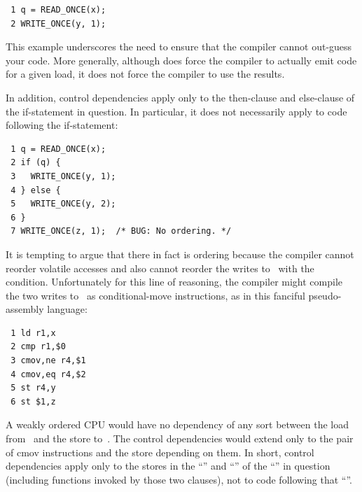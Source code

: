 \vspace{5pt}
\begin{minipage}[t]{\columnwidth}
\scriptsize
\begin{verbatim}
 1 q = READ_ONCE(x);
 2 WRITE_ONCE(y, 1);
\end{verbatim}
\end{minipage}
\vspace{5pt}

This example underscores the need to ensure that the compiler cannot
out-guess your code.
More generally, although  does force
the compiler to actually emit code for a given load, it does not force
the compiler to use the results.

In addition, control dependencies apply only to the then-clause and
else-clause of the if-statement in question.
In particular, it does
not necessarily apply to code following the if-statement:

\vspace{5pt}
\begin{minipage}[t]{\columnwidth}
\scriptsize
\begin{verbatim}
 1 q = READ_ONCE(x);
 2 if (q) {
 3   WRITE_ONCE(y, 1);
 4 } else {
 5   WRITE_ONCE(y, 2);
 6 }
 7 WRITE_ONCE(z, 1);  /* BUG: No ordering. */
\end{verbatim}
\end{minipage}
\vspace{5pt}

It is tempting to argue that there in fact is ordering because the
compiler cannot reorder volatile accesses and also cannot reorder
the writes to~ with the condition.
Unfortunately for this line
of reasoning, the compiler might compile the two writes to~ as
conditional-move instructions, as in this fanciful pseudo-assembly
language:

\vspace{5pt}
\begin{minipage}[t]{\columnwidth}
\scriptsize
\begin{verbatim}
 1 ld r1,x
 2 cmp r1,$0
 3 cmov,ne r4,$1
 4 cmov,eq r4,$2
 5 st r4,y
 6 st $1,z
\end{verbatim}
\end{minipage}
\vspace{5pt}

A weakly ordered CPU would have no dependency of any sort between the load
from~ and the store to~.
The control dependencies would extend
only to the pair of cmov instructions and the store depending on them.
In short, control dependencies apply only to the stores in the ``''
and ``'' of the ``'' in question (including functions
invoked by those two clauses), not to code following that ``''.

